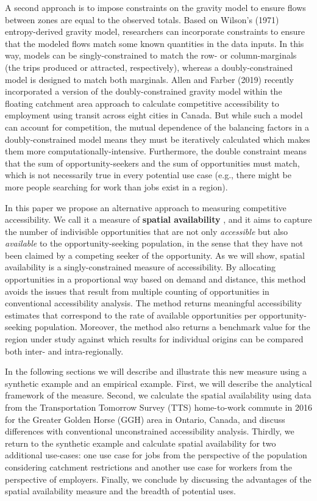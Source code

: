\documentclass[]{elsarticle} %
\begin{document}
A second approach is to impose constraints on the gravity model to
ensure flows between zones are equal to the observed totals. Based on
Wilson's (1971) entropy-derived gravity model, researchers can
incorporate constraints to ensure that the modeled flows match some
known quantities in the data inputs. In this way, models can be
singly-constrained to match the row- or column-marginals (the trips
produced or attracted, respectively), whereas a doubly-constrained model
is designed to match both marginals. Allen and Farber (2019) recently
incorporated a version of the doubly-constrained gravity model within
the floating catchment area approach to calculate competitive
accessibility to employment using transit across eight cities in Canada.
But while such a model can account for competition, the mutual
dependence of the balancing factors in a doubly-constrained model means
they must be iteratively calculated which makes them more
computationally-intensive. Furthermore, the double constraint means that
the sum of opportunity-seekers and the sum of opportunities must match,
which is not necessarily true in every potential use case (e.g., there
might be more people searching for work than jobs exist in a region).

In this paper we propose an alternative approach to measuring
competitive accessibility. We call it a measure of \textbf{spatial
availability} , and it aims to capture the number of indivisible
opportunities that are not only \emph{accessible} but also
\emph{available} to the opportunity-seeking population, in the sense
that they have not been claimed by a competing seeker of the
opportunity. As we will show, spatial availability is a
singly-constrained measure of accessibility. By allocating opportunities
in a proportional way based on demand and distance, this method avoids
the issues that result from multiple counting of opportunities in
conventional accessibility analysis. The method returns meaningful
accessibility estimates that correspond to the rate of available
opportunities per opportunity-seeking population. Moreover, the method
also returns a benchmark value for the region under study against which
results for individual origins can be compared both inter- and
intra-regionally.

In the following sections we will describe and illustrate this new
measure using a synthetic example and an empirical example. First, we
will describe the analytical framework of the measure. Second, we
calculate the spatial availability using data from the Transportation
Tomorrow Survey (TTS) home-to-work commute in 2016 for the Greater
Golden Horse (GGH) area in Ontario, Canada, and discuss differences with
conventional unconstrained accessibility analysis. Thirdly, we return to
the synthetic example and calculate spatial availability for two
additional use-cases: one use case for jobs from the perspective of the
population considering catchment restrictions and another use case for
workers from the perspective of employers. Finally, we conclude by
discussing the advantages of the spatial availability measure and the
breadth of potential uses.
\end{document}
